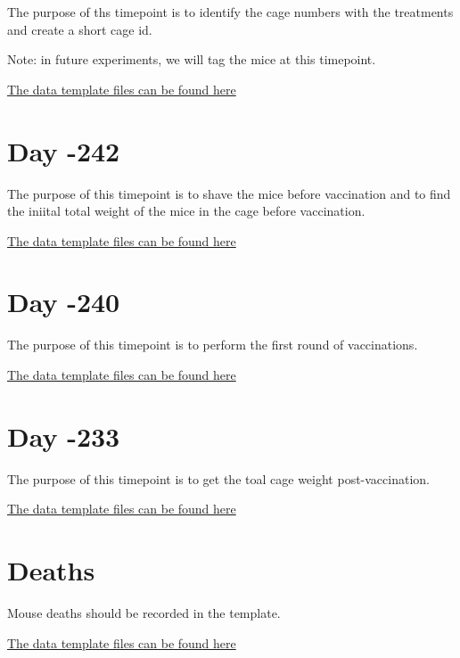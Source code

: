 \documentclass[]{book}
\begin{document}
The purpose of ths timepoint is to identify the cage numbers with the
treatments and create a short cage id.

Note: in future experiments, we will tag the mice at this timepoint.

\href{https://github.com/lyonsm7/impactb_book/raw/master/file_collection_templates/Base_Period/BP_T-247.xlsx}{The
data template files can be found here}

\chapter{Day -242}\label{day--242}

The purpose of this timepoint is to shave the mice before vaccination
and to find the iniital total weight of the mice in the cage before
vaccination.

\href{https://github.com/lyonsm7/impactb_book/raw/master/file_collection_templates/Base_Period/BP_T-242.xlsx}{The
data template files can be found here}

\chapter{Day -240}\label{day--240}

The purpose of this timepoint is to perform the first round of
vaccinations.

\href{https://github.com/lyonsm7/impactb_book/raw/master/file_collection_templates/Base_Period/BP_T-240.xlsx}{The
data template files can be found here}

\chapter{Day -233}\label{day--233}

The purpose of this timepoint is to get the toal cage weight
post-vaccination.

\href{https://github.com/lyonsm7/impactb_book/raw/master/file_collection_templates/Base_Period/BP_T-233.xlsx}{The
data template files can be found here}

\chapter{Deaths}\label{deaths}

Mouse deaths should be recorded in the template.

\href{https://github.com/lyonsm7/impactb_book/raw/master/file_collection_templates/Base_Period/BP_Mouse_Deaths.xlsx}{The
data template files can be found here}
\end{document}
